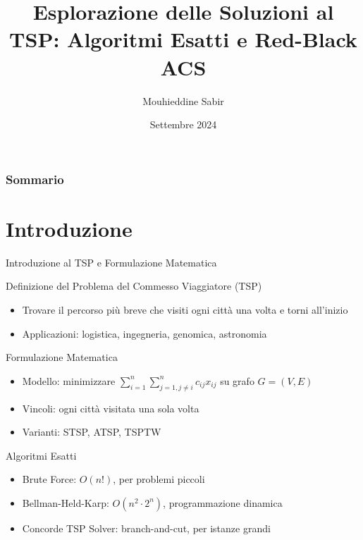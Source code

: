 \documentclass{beamer}
\title[Travelling Salesman Problem]{Esplorazione delle Soluzioni al TSP: Algoritmi Esatti e Red-Black ACS}
\author{Mouhieddine Sabir}
\institute[UniPD]{Università degli Studi di Padova}
\date{Settembre 2024}
\begin{document}
\frame{\titlepage}

\begin{frame}
    \frametitle{Sommario}
    \tableofcontents
\end{frame}

\section{Introduzione}
\tiny
\begin{frame}{Introduzione al TSP e Formulazione Matematica}
    \begin{block}{Definizione del Problema del Commesso Viaggiatore (TSP)}
        \begin{itemize}
            \item Trovare il percorso più breve che visiti ogni città una volta e torni all'inizio
            \item Applicazioni: logistica, ingegneria, genomica, astronomia
        \end{itemize}
    \end{block}

    \begin{block}{Formulazione Matematica}
        \begin{itemize}
            \item Modello: minimizzare $\sum_{i=1}^{n} \sum_{j=1, j \neq i}^{n} c_{ij} x_{ij}$ su grafo $G = (V, E)$
            \item Vincoli: ogni città visitata una sola volta
            \item Varianti: STSP, ATSP, TSPTW
        \end{itemize}
    \end{block}

    \begin{block}{Algoritmi Esatti}
        \begin{itemize}
            \item Brute Force: $O(n!)$, per problemi piccoli
            \item Bellman-Held-Karp: $O(n^2 \cdot 2^n)$, programmazione dinamica
            \item Concorde TSP Solver: branch-and-cut, per istanze grandi
        \end{itemize}
    \end{block}
\end{frame}
\end{document}
